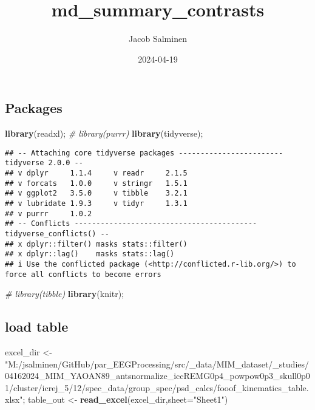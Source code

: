 \documentclass[
]{article}
\title{md\_summary\_contrasts}
\author{Jacob Salminen}
\date{2024-04-19}
\newenvironment{Shaded}{\begin{snugshade}}{\end{snugshade}}
\newcommand{\AttributeTok}[1]{\textcolor[rgb]{0.13,0.29,0.53}{#1}}
\newcommand{\CommentTok}[1]{\textcolor[rgb]{0.56,0.35,0.01}{\textit{#1}}}
\newcommand{\FunctionTok}[1]{\textcolor[rgb]{0.13,0.29,0.53}{\textbf{#1}}}
\newcommand{\NormalTok}[1]{#1}
\newcommand{\OtherTok}[1]{\textcolor[rgb]{0.56,0.35,0.01}{#1}}
\newcommand{\StringTok}[1]{\textcolor[rgb]{0.31,0.60,0.02}{#1}}
\begin{document}
\maketitle

\hypertarget{packages}{%
\subsection{Packages}\label{packages}}

\begin{Shaded}
\begin{Highlighting}[]
\FunctionTok{library}\NormalTok{(readxl);}
\CommentTok{\# library(purrr)}
\FunctionTok{library}\NormalTok{(tidyverse);}
\end{Highlighting}
\end{Shaded}

\begin{verbatim}
## -- Attaching core tidyverse packages ------------------------ tidyverse 2.0.0 --
## v dplyr     1.1.4     v readr     2.1.5
## v forcats   1.0.0     v stringr   1.5.1
## v ggplot2   3.5.0     v tibble    3.2.1
## v lubridate 1.9.3     v tidyr     1.3.1
## v purrr     1.0.2     
## -- Conflicts ------------------------------------------ tidyverse_conflicts() --
## x dplyr::filter() masks stats::filter()
## x dplyr::lag()    masks stats::lag()
## i Use the conflicted package (<http://conflicted.r-lib.org/>) to force all conflicts to become errors
\end{verbatim}

\begin{Shaded}
\begin{Highlighting}[]
\CommentTok{\# library(tibble)}
\FunctionTok{library}\NormalTok{(knitr);}
\end{Highlighting}
\end{Shaded}

\hypertarget{load-table}{%
\subsection{load table}\label{load-table}}

\begin{Shaded}
\begin{Highlighting}[]
\NormalTok{excel\_dir }\OtherTok{\textless{}{-}}\StringTok{"M:/jsalminen/GitHub/par\_EEGProcessing/src/\_data/MIM\_dataset/\_studies/04162024\_MIM\_YAOAN89\_antsnormalize\_iccREMG0p4\_powpow0p3\_skull0p01/cluster/icrej\_5/12/spec\_data/group\_spec/psd\_calcs/fooof\_kinematics\_table.xlsx"}\NormalTok{;}
\NormalTok{table\_out }\OtherTok{\textless{}{-}} \FunctionTok{read\_excel}\NormalTok{(excel\_dir,}\AttributeTok{sheet=}\StringTok{"Sheet1"}\NormalTok{) }
\end{Highlighting}
\end{Shaded}
\end{document}
